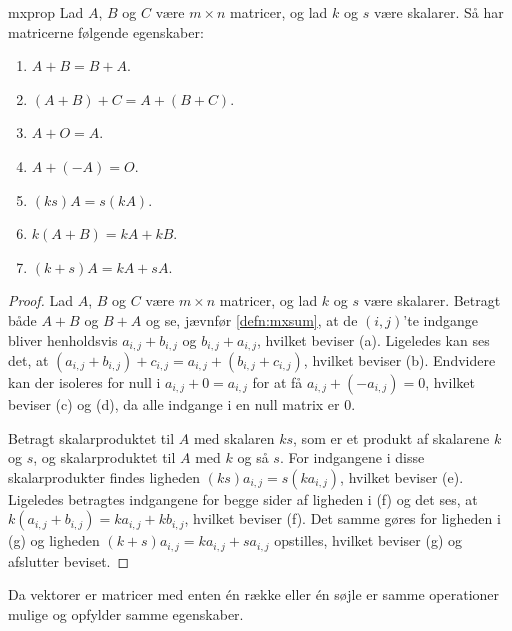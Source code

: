 %
\begin{thm}{}{mxprop}
Lad $A$, $B$ og $C$ være $m \times n$ matricer, og lad $k$ og $s$ være skalarer.
Så har matricerne følgende egenskaber:
\begin{enumerate}[label=(\alph*)]
\item $A + B = B + A$.
\item $(A + B) + C = A + (B + C)$.
\item $A + O = A$.
\item $A + (-A) = O$.
\item $(ks)A = s(kA)$.
\item $k(A + B) = kA + kB$.
\item $(k + s)A = kA + sA$.
\end{enumerate}
\end{thm}
%
\begin{proof}
Lad $A$, $B$ og $C$ være $m \times n$ matricer, og lad $k$ og $s$ være skalarer.
Betragt både $A + B$ og $B + A$ og se, jævnfør \ref{defn:mxsum}, at de $(i,j)$'te indgange bliver henholdsvis $a_{i,j} + b_{i,j}$ og $b_{i,j} + a_{i,j}$, hvilket beviser (a).
Ligeledes kan ses det, at $(a_{i,j} + b_{i,j}) + c_{i,j} = a_{i,j} + (b_{i,j} + c_{i,j})$, hvilket beviser (b).
Endvidere kan der isoleres for null i $a_{i,j} + 0 = a_{i,j}$ for at få $a_{i,j} + (-a_{i,j}) = 0$, hvilket beviser (c) og (d), da alle indgange i en null matrix er $0$.

Betragt skalarproduktet til $A$ med skalaren $ks$, som er et produkt af skalarene $k$ og $s$, og skalarproduktet til $A$ med $k$ og så $s$.
For indgangene i disse skalarprodukter findes ligheden $(ks)a_{i,j} = s(ka_{i,j})$, hvilket beviser (e).
Ligeledes betragtes indgangene for begge sider af ligheden i (f) og det ses, at $k(a_{i,j} + b_{i,j}) = ka_{i,j} + kb_{i,j}$, hvilket beviser (f).
Det samme gøres for ligheden i (g) og ligheden $(k + s)a_{i,j} = ka_{i,j} + sa_{i,j}$ opstilles, hvilket beviser (g) og afslutter beviset.
\end{proof}

Da vektorer er matricer med enten én række eller én søjle er samme operationer mulige og opfylder samme egenskaber.